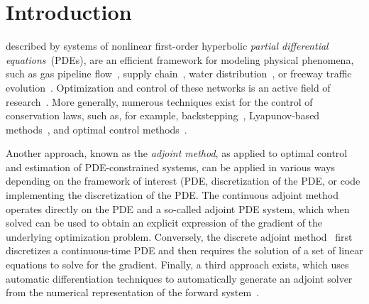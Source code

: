\section{Introduction} %
\label{sec:introduction}

described by systems of nonlinear first-order hyperbolic \textit{partial
differential equations}~(PDEs), are an efficient framework for modeling
physical phenomena,  such as gas pipeline flow~\cite{Rothfarb1970}, supply
chain~\cite{Brunnermeier1999}, water distribution~\cite{Nguyen}, or freeway
traffic evolution~\cite{garavello2006traffic,work2010traffic}. Optimization
and  control of these networks is an active field of
research~\cite{Gugat2005,Bayen2006,Kotsialos2004}. More generally, numerous
techniques exist for the control of conservation laws, such as, for example,
backstepping~\cite{Vazquez2011}, Lyapunov-based methods~\cite{Coron2013}, and
optimal control methods~\cite{Jacquet2006}.

Another approach, known as the \textit{adjoint method}, as applied to optimal
control and estimation of  PDE-constrained systems, can be applied in various
ways depending on the  framework of interest (PDE, discretization of the PDE,
or code implementing the  discretization of the PDE. The continuous adjoint
method~\cite{Jacquet2005,Gugat2005,Moin1994,Reuther1996} operates directly on
the PDE and a so-called adjoint PDE system, which when solved can be used to
obtain an explicit  expression of the gradient of the underlying optimization
problem. Conversely,  the discrete adjoint
method~\cite{Giles2000,Gugat2005,Kotsialos2004} first discretizes a
continuous-time PDE and then requires the solution of a set of linear
equations  to solve for the gradient. Finally, a third approach exists, which
uses  automatic differentiation techniques to automatically generate an
adjoint  solver from the numerical representation of the forward
system~\cite{Muller2005,Giering1998}.

